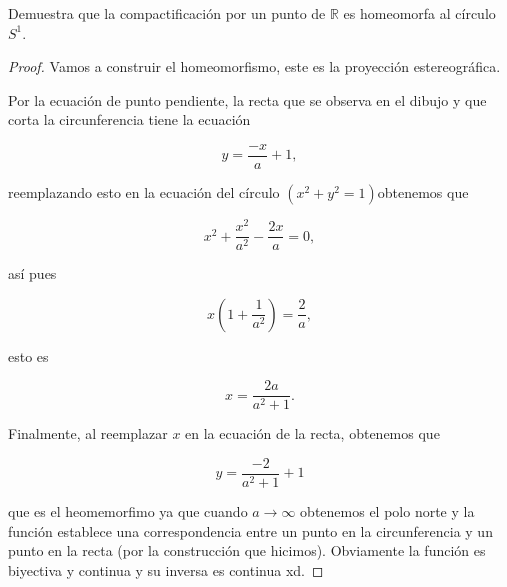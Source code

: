 
\item Demuestra que la compactificación por un punto de $\mathbb{R}$ es homeomorfa al círculo $S^1$.\\

\begin{proof}
    Vamos a construir el homeomorfismo, este es la proyección estereográfica.

\begin{center}
    
\end{center}

Por la ecuación de punto pendiente, la recta que se observa en el dibujo y que corta la circunferencia  tiene la ecuación 

$$y=\frac{-x}{a}+1,$$

reemplazando esto en la ecuación del círculo $(x^2+y^2=1)$obtenemos que 

$$x^2+\frac{x^2}{a^2}-\frac{2x}{a}=0,$$

así pues

$$x\left(1+\frac{1}{a^2}\right)=\frac{2}{a},$$

esto es 

$$x=\frac{2a}{a^2+1}.$$

Finalmente, al reemplazar $x$ en la ecuación de la recta, obtenemos que 

$$y=\frac{-2}{a^2+1}+1$$

que es el heomemorfimo ya que cuando $a\to \infty$ obtenemos el polo norte y la función establece una correspondencia entre un punto en la circunferencia y un punto en la recta (por la construcción que hicimos). Obviamente la función es biyectiva y continua y su inversa es continua xd.

\end{proof}